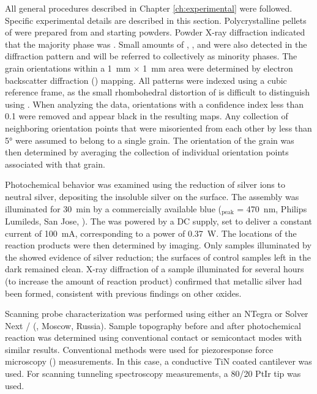 All general procedures described in Chapter \ref{ch:experimental} were followed. Specific experimental details are described in this section. Polycrystalline pellets of  were prepared from  and  starting powders. Powder X-ray diffraction indicated that the majority phase was . Small amounts of , , and  were also detected in the diffraction pattern and will be referred to collectively as minority phases. The grain orientations within a \SI{1}{\milli\meter} $\times$ \SI{1}{\milli\meter} area were determined by electron backscatter diffraction () mapping. All patterns were indexed using a cubic reference frame, as the small rhombohedral distortion\cite{Luo:2006kg} of  is difficult to distinguish using . When analyzing the  data, orientations with a confidence index less than 0.1 were removed and appear black in the resulting  maps. Any collection of neighboring orientation points that were misoriented from each other by less than 5\si{\degree} were assumed to belong to a single grain. The orientation of the grain was then determined by averaging the collection of individual orientation points associated with that grain.

Photochemical behavior was examined using the reduction of silver ions to neutral silver, depositing the insoluble silver on the surface.\cite{CLARK:1965ct,HERRMANN:1988do} The assembly was illuminated for \SI{30}{\minute} by a commercially available blue  (\textlambda$_\text{peak}$ = \SI{470}{\nano\meter}, Philips Lumileds, San Jose, ). The  was powered by a DC supply, set to deliver a constant current of \SI{100}{\milli\ampere}, corresponding to a power of \SI{0.37}{\watt}. The locations of the reaction products were then determined by  imaging. Only samples illuminated by the  showed evidence of silver reduction; the surfaces of control samples left in the dark remained clean. X-ray diffraction of a sample illuminated for several hours (to increase the amount of reaction product) confirmed that metallic silver had been formed, consistent with previous findings on other oxides.\cite{Giocondi:2001gz,Lowekamp:1998ks}

Scanning probe characterization was performed using either an  NTegra or Solver Next / (, Moscow, Russia). Sample topography before and after photochemical reaction was determined using conventional contact or semicontact modes with similar results. Conventional methods were used for piezoresponse force microscopy () measurements.\cite{Christman:1998vu} In this case, a conductive TiN coated cantilever was used. For scanning tunneling spectroscopy measurements, a 80/20 PtIr tip was used.


